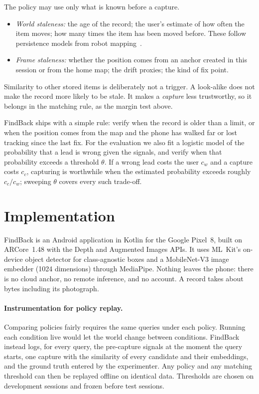 \documentclass[sigconf,10pt]{acmart}
\newcommand{\sys}{FindBack}
\begin{document}
The policy may use only what is known before a capture.

\begin{itemize}
\item \emph{World staleness:} the age of the record; the user's estimate of how often the item
  moves; how many times the item has been moved before.
  These follow persistence models from robot
  mapping~\cite{rosen2016towards,toris2017temporal,bogenberger2026glasses,ghosh2026memory}.
\item \emph{Frame staleness:} whether the position comes from an anchor created in this session or
  from the home map; the drift proxies; the kind of fix point.
\end{itemize}

Similarity to other stored items is deliberately not a trigger.
A look-alike does not make the record more likely to be stale.
It makes a \emph{capture} less trustworthy, so it belongs in the matching rule, as the margin test
above.

\sys{} ships with a simple rule: verify when the record is older than a limit, or when the
position comes from the map and the phone has walked far or lost tracking since the last fix.
For the evaluation we also fit a logistic model of the probability that a lead is wrong given the
signals, and verify when that probability exceeds a threshold $\theta$.
If a wrong lead costs the user $c_w$ and a capture costs $c_c$, capturing is worthwhile when the
estimated probability exceeds roughly $c_c/c_w$; sweeping $\theta$ covers every such trade-off.

\section{Implementation}

\sys{} is an Android application in Kotlin for the Google Pixel~8, built on ARCore~1.48 with the
Depth and Augmented Images APIs.
It uses ML~Kit's on-device object detector for class-agnostic boxes and a MobileNet-V3 image
embedder (1024 dimensions) through MediaPipe.
Nothing leaves the phone: there is no cloud anchor, no remote inference, and no account.
A record takes about \BytesPerItem{}\,bytes including its photograph.

\paragraph{Instrumentation for policy replay.}
Comparing policies fairly requires the same queries under each policy.
Running each condition live would let the world change between conditions.
\sys{} instead logs, for every query, the pre-capture signals at the moment the query starts, one
capture with the similarity of every candidate and their embeddings, and the ground truth entered
by the experimenter.
Any policy and any matching threshold can then be replayed offline on identical data.
Thresholds are chosen on development sessions and frozen before test sessions.
\end{document}
